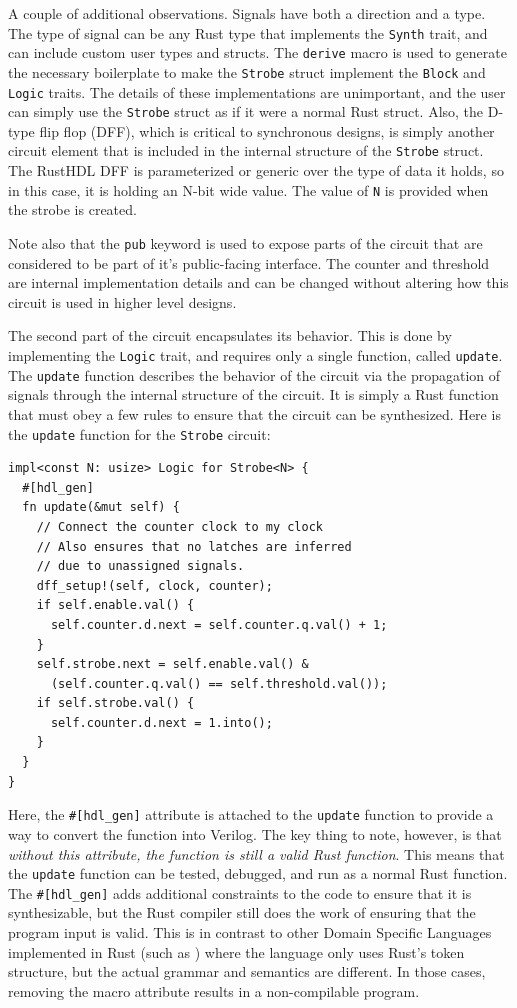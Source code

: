 \documentclass[conference]{IEEEtran}
\begin{document}
A couple of additional observations.  Signals have both a direction and a type.  The type of
signal can be any Rust type that implements the \verb|Synth| trait, and can include custom user
types and structs.  The \verb|derive| macro is used to generate the necessary boilerplate to make the 
\verb|Strobe| struct implement the \verb|Block| and \verb|Logic| traits.  The details of these implementations are
unimportant, and the user can simply use the \verb|Strobe| struct as if it were a normal Rust struct.  Also,
the D-type flip flop (DFF), which is critical to synchronous designs, is simply another circuit element that
is included in the internal structure of the \verb|Strobe| struct.  The RustHDL DFF is parameterized or 
generic over the type of data it holds, so in this case, it is holding an N-bit wide value.  The value of
\verb|N| is provided when the strobe is created.

Note also that the \verb|pub| keyword is used to expose parts of the circuit that are considered to be part
of it's public-facing interface.   The counter and threshold are internal implementation details and can be
changed without altering how this circuit is used in higher level designs.

The second part of the circuit encapsulates its behavior.  This is done by implementing the \verb|Logic| trait,
and requires only a single function, called \verb|update|.  The \verb|update| function describes the behavior
of the circuit via the propagation of signals through the internal structure of the circuit.  It is simply a Rust function
that must obey a few rules to ensure that the circuit can be synthesized.  Here is the \verb|update| function for
the \verb|Strobe| circuit:

\begin{verbatim}
impl<const N: usize> Logic for Strobe<N> {
  #[hdl_gen]
  fn update(&mut self) {
    // Connect the counter clock to my clock
    // Also ensures that no latches are inferred
    // due to unassigned signals.
    dff_setup!(self, clock, counter);
    if self.enable.val() {
      self.counter.d.next = self.counter.q.val() + 1;
    }
    self.strobe.next = self.enable.val() & 
      (self.counter.q.val() == self.threshold.val());
    if self.strobe.val() {
      self.counter.d.next = 1.into();
    }
  }
}
\end{verbatim}

Here, the \verb|#[hdl_gen]| attribute is attached to the \verb|update| function to provide a way to convert the function
into Verilog.  The key thing to note, however, is that \emph{without this attribute, the function is still a valid Rust function}.
This means that the \verb|update| function can be tested, debugged, and run as a normal Rust function.  The \verb|#[hdl_gen]| adds
additional constraints to the code to ensure that it is synthesizable, but the Rust compiler still does the work of ensuring that the 
program input is valid.  This is in contrast to other Domain Specific Languages implemented in Rust (such as \cite{b10}) where the 
language only uses Rust's token structure, but the actual grammar and semantics are different.  In those cases, removing the 
macro attribute results in a non-compilable program.
\end{document}
